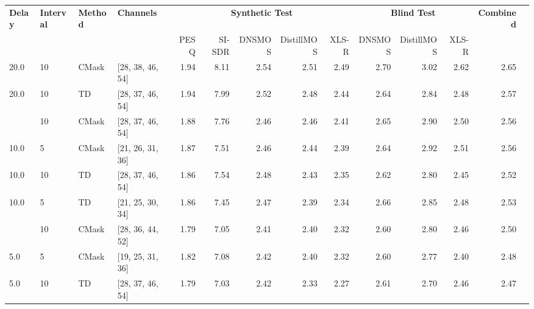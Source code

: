 \begin{tabular}{llllrrrrrrrrrr}
\toprule
\textbf{Delay} & \textbf{Interval} & \textbf{Method} & \textbf{Channels} & \multicolumn{5}{c}{\textbf{Synthetic Test}} & \multicolumn{3}{c}{\textbf{Blind Test}} & \textbf{Combined} \\
 &  &  &  & PESQ & SI-SDR & DNSMOS & DistillMOS & XLS-R & DNSMOS & DistillMOS & XLS-R &  \\
\midrule
20.0 & 10 & CMask & [28, 38, 46, 54] & \cellcolor{green!20}1.94 & \cellcolor{green!20}8.11 & \cellcolor{green!20}2.54 & \cellcolor{green!20}2.51 & \cellcolor{green!20}2.49 & \cellcolor{green!20}2.70 & \cellcolor{green!20}3.02 & \cellcolor{green!20}2.62 & \cellcolor{green!50}2.65 \\
20.0 & 10 & TD & [28, 37, 46, 54] & \cellcolor{green!20}1.94 & \cellcolor{green!20}7.99 & \cellcolor{green!20}2.52 & \cellcolor{green!20}2.48 & \cellcolor{green!20}2.44 & \cellcolor{green!20}2.64 & \cellcolor{green!20}2.84 & \cellcolor{green!20}2.48 & \cellcolor{green!50}2.57 \\
\hdashline
\midrule
10.0 & 10 & CMask & [28, 37, 46, 54] & \cellcolor{green!20}1.88 & \cellcolor{green!20}7.76 & 2.46 & \cellcolor{green!20}2.46 & \cellcolor{green!20}2.41 & \cellcolor{green!20}2.65 & 2.90 & 2.50 & \cellcolor{green!50}2.56 \\
10.0 & 5 & CMask & [21, 26, 31, 36] & 1.87 & 7.51 & \cellcolor{green!20}2.46 & 2.44 & 2.39 & 2.64 & \cellcolor{green!20}2.92 & \cellcolor{green!20}2.51 & 2.56 \\
10.0 & 10 & TD & [28, 37, 46, 54] & \cellcolor{green!20}1.86 & \cellcolor{green!20}7.54 & \cellcolor{green!20}2.48 & \cellcolor{green!20}2.43 & \cellcolor{green!20}2.35 & 2.62 & 2.80 & 2.45 & 2.52 \\
10.0 & 5 & TD & [21, 25, 30, 34] & 1.86 & 7.45 & 2.47 & 2.39 & 2.34 & \cellcolor{green!20}2.66 & \cellcolor{green!20}2.85 & \cellcolor{green!20}2.48 & \cellcolor{green!50}2.53 \\
\hdashline
\midrule
5.0 & 10 & CMask & [28, 36, 44, 52] & 1.79 & 7.05 & 2.41 & \cellcolor{green!20}2.40 & \cellcolor{green!20}2.32 & 2.60 & \cellcolor{green!20}2.80 & \cellcolor{green!20}2.46 & \cellcolor{green!50}2.50 \\
5.0 & 5 & CMask & [19, 25, 31, 36] & \cellcolor{green!20}1.82 & \cellcolor{green!20}7.08 & \cellcolor{green!20}2.42 & 2.40 & 2.32 & \cellcolor{green!20}2.60 & 2.77 & 2.40 & 2.48 \\
5.0 & 10 & TD & [28, 37, 46, 54] & 1.79 & 7.03 & 2.42 & \cellcolor{green!20}2.33 & 2.27 & \cellcolor{green!20}2.61 & \cellcolor{green!20}2.70 & \cellcolor{green!20}2.46 & \cellcolor{green!50}2.47 \\

\end{tabular}
